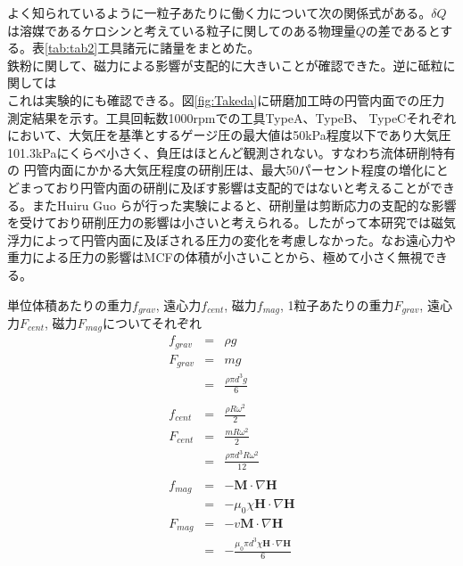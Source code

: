\documentclass[12pt]{jarticle}
\begin{document}
よく知られているように一粒子あたりに働く力について次の関係式がある。$\delta Q$は溶媒であるケロシンと考えている粒子に関してのある物理量$Q$の差であるとする。表\ref{tab:tab2}工具諸元に諸量をまとめた。\\
鉄粉に関して、磁力による影響が支配的に大きいことが確認できた。逆に砥粒に関しては \\
これは実験的にも確認できる。図\ref{fig:Takeda}に研磨加工時の円管内面での圧力測定結果を示す。工具回転数1000rpmでの工具TypeA、TypeB、 TypeCそれぞれにおいて、大気圧を基準とするゲージ圧の最大値は50kPa程度以下であり大気圧101.3kPaにくらべ小さく、負圧はほとんど観測されない。すなわち流体研削特有の 円管内面にかかる大気圧程度の研削圧は、最大50パーセント程度の増化にとどまっており円管内面の研削に及ぼす影響は支配的ではないと考えることができる。またHuiru Guo らが行った実験\cite{Huiru}によると、研削量は剪断応力の支配的な影響を受けており研削圧力の影響は小さいと考えられる。したがって本研究では磁気浮力によって円管内面に及ぼされる圧力の変化を考慮しなかった。なお遠心力や重力による圧力の影響はMCFの体積が小さいことから、極めて小さく無視できる。
 

単位体積あたりの重力$f_{grav}$, 遠心力$f_{cent}$, 磁力$f_{mag}$, 1粒子あたりの重力$F_{grav}$, 遠心力$F_{cent}$, 磁力$F_{mag}$についてそれぞれ
      \begin{eqnarray}
        f_{grav} & = & \rho g  \\ 
        F_{grav} & = & m g \nonumber \\ 
                 & = & \frac{ \rho \pi d^3 g }{6} \label{grav} \\ \nonumber \\
        f_{cent} & = & \frac{\rho R \omega^2 }{2}   \\
        F_{cent} & = & \frac{m R \omega^2 }{2} \nonumber \\
                 & = & \frac{ \rho \pi d^3 R \omega^2 }{12} \label{cent} \\ \nonumber \\
        f_{mag} & = & - \bm{M} \cdot \nabla \bm{H} \nonumber \\
                & = & - \mu_0 \chi \bm{H} \cdot \nabla \bm{H}  \\
        F_{mag} & = & - v \bm{M} \cdot \nabla \bm{H} \nonumber \\
                & = & - \frac{ \mu_0 \pi d^3 \chi \bm{H} \cdot \nabla \bm{H} }{6} \label{mag} 
      \end{eqnarray}　

\end{document}
